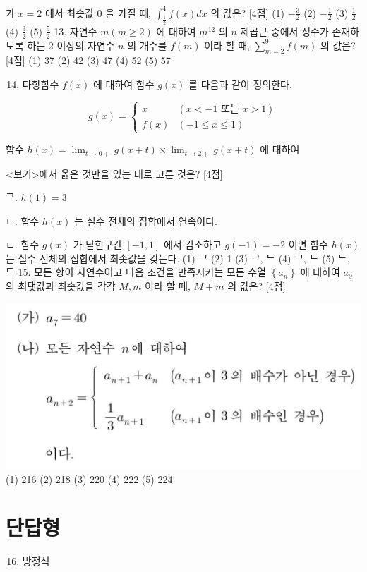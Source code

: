 \documentclass[10pt]{article}
\begin{document}
가 $x=2$ 에서 최솟값 0 을 가질 때, $\int_{\frac{1}{2}}^{4} f(x) d x$ 의 값은? [4점]
(1) $-\frac{3}{2}$
(2) $-\frac{1}{2}$
(3) $\frac{1}{2}$
(4) $\frac{3}{2}$
(5) $\frac{5}{2}$ 13. 자연수 $m(m \geq 2)$ 에 대하여 $m^{12}$ 의 $n$ 제곱근 중에서 정수가 존재하도록 하는 2 이상의 자연수 $n$ 의 개수를 $f(m)$ 이라 할 때, $\sum_{m=2}^{9} f(m)$ 의 값은? [4점]
(1) 37
(2) 42
(3) 47
(4) 52
(5) 57

\begin{enumerate}
  \setcounter{enumi}{13}
  \item 다항함수 $f(x)$ 에 대하여 함수 $g(x)$ 를 다음과 같이 정의한다.
\end{enumerate}

$$
g(x)= \begin{cases}x & (x<-1 \text { 또는 } x>1) \\ f(x) & (-1 \leq x \leq 1)\end{cases}
$$

함수 $h(x)=\lim _{t \rightarrow 0+} g(x+t) \times \lim _{t \rightarrow 2+} g(x+t)$ 에 대하여

<보기>에서 옳은 것만을 있는 대로 고른 것은? [4점]

ᄀ. $h(1)=3$

ㄴ. 함수 $h(x)$ 는 실수 전체의 집합에서 연속이다.

ㄷ. 함수 $g(x)$ 가 닫힌구간 $[-1,1]$ 에서 감소하고 $g(-1)=-2$ 이면 함수 $h(x)$ 는 실수 전체의 집합에서 최솟값을 갖는다.
(1) ᄀ
(2) 1
(3) ᄀ, ᄂ (4) ᄀ, ᄃ
(5) ᄂ, ᄃ 15. 모든 항이 자연수이고 다음 조건을 만족시키는 모든 수열 $\left\{a_{n}\right\}$ 에 대하여 $a_{9}$ 의 최댓값과 최솟값을 각각 $M, m$ 이라 할 때, $M+m$ 의 값은? [4점]

\includegraphics[max width=\textwidth, center]{2023_06_06_b380aa8523ec7afae994g-06}
(1) 216
(2) 218
(3) 220
(4) 222
(5) 224

\section{단답형}
\begin{enumerate}
  \setcounter{enumi}{15}
  \item 방정식
\end{enumerate}
\end{document}
